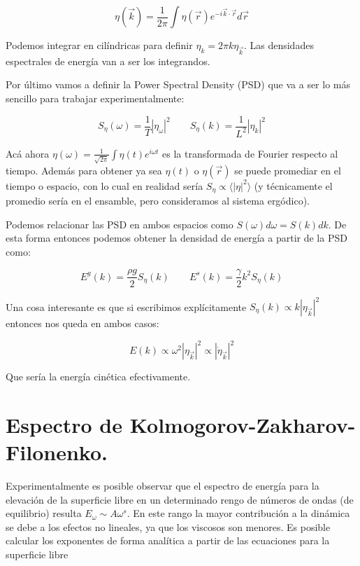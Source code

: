 \begin{equation}
	\eta(\vec k) = \frac{1}{2\pi}\int\eta(\vec r)e^{-i\vec k\cdot\vec r} d\vec r
\end{equation}

Podemos integrar en cilíndricas para definir $\eta_k = 2\pi k\eta_{\vec k}$. Las densidades espectrales de energía van a ser los integrandos. 

Por último vamos a definir la Power Spectral Density (PSD) que va a ser lo más sencillo para trabajar experimentalmente:

\begin{equation}
	S_\eta(\omega) = \frac{1}{T} |\eta_\omega|^2 \qquad S_\eta(k) = \frac{1}{L^2} |\eta_k|^2
\end{equation}

Acá ahora $\eta(\omega) = \frac{1}{\sqrt{2\pi}}\int\eta(t)e^{i\omega t}$ es la transformada de Fourier respecto al tiempo. Además para obtener ya sea $\eta(t)$ o $\eta(\vec r)$ se puede promediar en el tiempo o espacio, con lo cual en realidad sería $S_\eta\propto\langle |\eta|^2 \rangle$ (y técnicamente el promedio sería en el ensamble, pero consideramos al sistema ergódico). \cite{falconExperimentsSurfaceGravity2022}

Podemos relacionar las PSD en ambos espacios como $S(\omega)d\omega=S(k)dk$. De esta forma entonces podemos obtener la densidad de energía a partir de la PSD como:

\begin{equation}
		E^g(k) = \frac{\rho g}{2} S_\eta(k) \qquad E^s(k)=\frac{\gamma}{2}k^2S_\eta(k)
\end{equation}


Una cosa interesante es que si escribimos explícitamente $S_\eta(k) \propto k|\eta_{\vec k}|^2$ entonces nos queda en ambos casos:

\begin{equation}
	E(k) \propto \omega^2|\eta_{\vec k}|^2 \propto |\dot \eta_{\vec k}|^2 
\end{equation}

Que sería la energía cinética efectivamente.


\section{Espectro de Kolmogorov-Zakharov-Filonenko.}
Experimentalmente es posible observar que el espectro de energía para la elevación de la superficie libre en un determinado rengo de números de ondas (de equilibrio) resulta $E_\omega  \sim A\omega^s$. En este rango la mayor contribución a la dinámica se debe a los efectos no lineales, ya que los viscosos son menores. Es posible calcular los exponentes de forma analítica a partir de las ecuaciones para la superficie libre \cite{zakharovEnergySpectrumStochastic1967}

